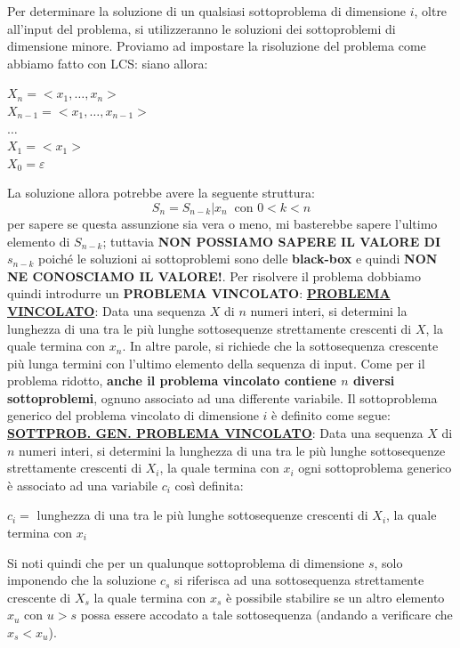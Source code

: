 \documentclass[12pt]{article}
\begin{document}
Per determinare la soluzione di un qualsiasi sottoproblema di dimensione $i$, oltre all'input del problema, si utilizzeranno le soluzioni dei sottoproblemi di dimensione minore.
Proviamo ad impostare la risoluzione del problema come abbiamo fatto con LCS: siano allora:
\begin{center}
    $X_n = <x_1, \dots, x_n>$ \\
    $X_{n-1} = <x_1, \dots, x_{n-1}>$ \\
    $\dots$ \\
    $X_1 = <x_1>$ \\
    $X_0 = \varepsilon$
\end{center}
La soluzione allora potrebbe avere la seguente struttura:
$$S_n =S_{n-k}|x_n \; \; \textrm{con } 0 < k < n$$
per sapere se questa assunzione sia vera o meno, mi basterebbe sapere l'ultimo elemento di $S_{n-k}$; tuttavia
\textbf{NON POSSIAMO SAPERE IL VALORE DI $s_{n-k}$} poiché le soluzioni ai sottoproblemi sono delle \textbf{black-box} e quindi
\textbf{NON NE CONOSCIAMO IL VALORE!}. Per risolvere il problema dobbiamo quindi introdurre un \textbf{PROBLEMA VINCOLATO}: \newline
\textbf{\underline{PROBLEMA VINCOLATO}}: Data una sequenza $X$ di $n$ numeri interi, si determini la lunghezza di una tra le più lunghe sottosequenze strettamente crescenti
di $X$, la quale termina con $x_n$. \newline
In altre parole, si richiede che la sottosequenza crescente più lunga termini con l'ultimo elemento della sequenza di input.
Come per il problema ridotto, \textbf{anche il problema vincolato contiene $n$ diversi sottoproblemi}, ognuno associato ad una differente variabile.
Il sottoproblema generico del problema vincolato di dimensione $i$ è definito come segue: \newline
\textbf{\underline{SOTTPROB. GEN. PROBLEMA VINCOLATO}}: Data una sequenza $X$ di $n$ numeri interi, si determini la lunghezza di una tra le più lunghe sottosequenze strettamente crescenti di $X_i$, la quale termina con $x_i$ \newline
ogni sottoproblema generico è associato ad una variabile $c_i$ così definita:
\begin{center}
    $c_i = $ lunghezza di una tra le più lunghe sottosequenze crescenti di $X_i$, la quale termina con $x_i$
\end{center}
Si noti quindi che per un qualunque sottoproblema di dimensione $s$, solo imponendo che la soluzione $c_s$ si riferisca ad una sottosequenza strettamente crescente
di $X_s$ la quale termina con $x_s$ è possibile stabilire se un altro elemento $x_u$ con $u > s$ possa essere accodato a tale sottosequenza (andando a verificare che $x_s < x_u$). \newline
\end{document}
